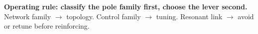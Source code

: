 \documentclass{article}
\begin{document}
\vspace{0.45cm}

{\setlength{\fboxsep}{0.42cm}
\noindent\colorbox{iasdark}{%
\begin{minipage}{\dimexpr\textwidth-2\fboxsep\relax}
\centering\color{white}
{\fontsize{40}{48}\selectfont\bfseries Operating rule: classify the pole family first, choose the lever second.}
\quad
{\fontsize{30}{38}\selectfont Network family \(\rightarrow\) topology. Control family \(\rightarrow\) tuning. Resonant link \(\rightarrow\) avoid or retune before reinforcing.}
\end{minipage}}}
\end{document}
